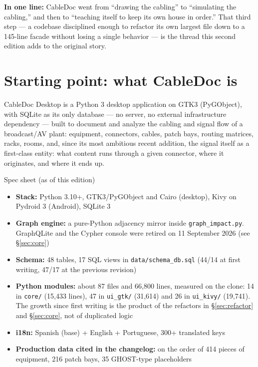 \documentclass[10.4pt,twocolumn]{article}
\begin{document}
\begin{pullquote}
\headfont\textbf{In one line:} CableDoc went from ``drawing the cabling'' to ``simulating the cabling,'' and then to ``teaching itself to keep its own house in order.'' That third step --- a codebase disciplined enough to refactor its own largest file down to a 145-line facade without losing a single behavior --- is the thread this second edition adds to the original story.
\end{pullquote}

\section{Starting point: what CableDoc is}

CableDoc Desktop is a Python 3 desktop application on GTK3 (PyGObject), with SQLite as its only database --- no server, no external infrastructure dependency --- built to document and analyze the cabling and signal flow of a broadcast/AV plant: equipment, connectors, cables, patch bays, routing matrices, racks, rooms, and, since its most ambitious recent addition, the signal itself as a first-class entity: what content runs through a given connector, where it originates, and where it ends up.

\begin{specbox}{Spec sheet (as of this edition)}
\begin{itemize}[leftmargin=1.0em,itemsep=1pt,topsep=2pt]
\item \textbf{Stack:} Python 3.10+, GTK3/PyGObject and Cairo (desktop), Kivy on Pydroid 3 (Android), SQLite 3
\item \textbf{Graph engine:} a pure-Python adjacency mirror inside \texttt{graph\_impact.py}. GraphQLite and the Cypher console were retired on 11 September 2026 (see \S\ref{sec:core})
\item \textbf{Schema:} 48 tables, 17 SQL views in \texttt{data/schema\_db.sql} (44/14 at first writing, 47/17 at the previous revision)
\item \textbf{Python modules:} about 87 files and 66{,}800 lines, measured on the clone: 14 in \texttt{core/} (15{,}433 lines), 47 in \texttt{ui\_gtk/} (31{,}614) and 26 in \texttt{ui\_kivy/} (19{,}741). The growth since first writing is the product of the refactors in \S\ref{sec:refactor} and \S\ref{sec:core}, not of duplicated logic
\item \textbf{i18n:} Spanish (base) + English + Portuguese, 300+ translated keys
\item \textbf{Production data cited in the changelog:} on the order of 414 pieces of equipment, 216 patch bays, 35 GHOST-type placeholders
\end{itemize}
\end{specbox}
\end{document}
